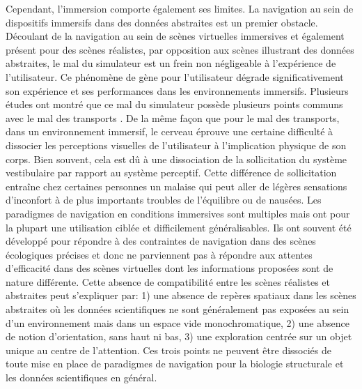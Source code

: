 Cependant, l'immersion comporte également ses limites. La navigation au sein de dispositifs immersifs dans des données abstraites est un premier obstacle. Découlant de la navigation au sein de scènes virtuelles immersives et également présent pour des scènes réalistes, par opposition aux scènes illustrant des données abstraites, le mal du simulateur est un frein non négligeable à l'expérience de l'utilisateur. Ce phénomène de gène pour l'utilisateur dégrade significativement son expérience et ses performances dans les environnements immersifs. Plusieurs études ont montré que ce mal du simulateur possède plusieurs points communs avec le mal des transports \cite{laviola_jr_discussion_2000}. De la même façon que pour le mal des transports, dans un environnement immersif, le cerveau éprouve une certaine difficulté à dissocier les perceptions visuelles de l'utilisateur à l'implication physique de son corps. Bien souvent, cela est dû à une dissociation de la sollicitation du système vestibulaire par rapport au système perceptif. Cette différence de sollicitation entraîne chez certaines personnes un malaise qui peut aller de légères sensations d'inconfort à de plus importants troubles de l'équilibre ou de nausées. Les paradigmes de navigation en conditions immersives sont multiples mais ont pour la plupart une utilisation ciblée et difficilement généralisables. Ils ont souvent été développé pour répondre à des contraintes de navigation dans des scènes écologiques précises et donc ne parviennent pas à répondre aux attentes d'efficacité dans des scènes virtuelles dont les informations proposées sont de nature différente. Cette absence de compatibilité entre les scènes réalistes et abstraites peut s'expliquer par: 1) une absence de repères spatiaux dans les scènes abstraites où les données scientifiques ne sont généralement pas exposées au sein d'un environnement mais dans un espace vide monochromatique, 2) une absence de notion d'orientation, sans haut ni bas, 3) une exploration centrée sur un objet unique au centre de l'attention. Ces trois points ne peuvent être dissociés de toute mise en place de paradigmes de navigation pour la biologie structurale et les données scientifiques en général.

